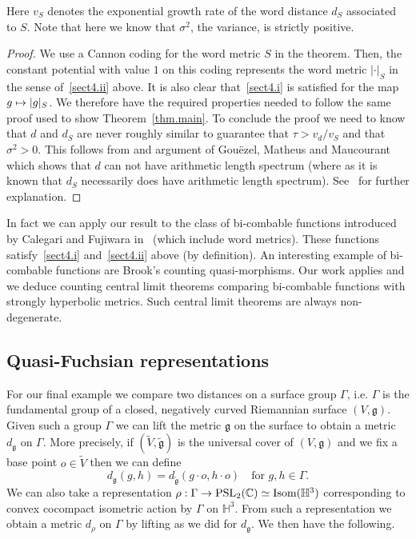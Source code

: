 \documentclass[10pt]{amsart}
\theoremstyle{definition}\newtheorem{defi}[theo]{Definition}\newtheorem{rema}[theo]{Remark}\newtheorem{exam}[theo]{Example}\newtheorem{exem}[theo]{Example}\newtheorem{nota}[theo]{Notation}
\newcommand{\G}{\Gamma}
\newcommand{\fkg}{\mathfrak{g}}
\newcommand{\C}{\mathbb{C}}
\renewcommand{\H}{\mathbb{H}}
\DeclareMathOperator{\PSL}{PSL}
\renewcommand*{\to}{\mathchoice{\longrightarrow}{\rightarrow}{\rightarrow}{\rightarrow}}
\let\oldmapsto\mapsto
\renewcommand*{\mapsto}{\mathchoice{\longmapsto}{\oldmapsto}{\oldmapsto}{\oldmapsto}}
\theoremstyle{plain}
\begin{document}
Here $v_S$ denotes the exponential growth rate of the word distance $d_S$ associated to $S$. Note that here we know that $\sigma^2$, the variance, is strictly positive.
\begin{proof}
We use a Cannon coding for the word metric $S$ in the theorem. Then, the constant potential with value $1$ on this coding represents the word metric $|\cdot|_S$ in the sense of~\eqref{sect4.ii} above. It is also clear that~\eqref{sect4.i} is satisfied for the map $g \mapsto |g|_S$. We therefore have the required properties needed to follow the same proof used to show Theorem~\ref{thm.main}. To conclude the proof we need to know that $d$ and $d_S$ are never roughly similar to guarantee that $\tau > v_d/v_S$ and that $\sigma^2 > 0$. This follows from and argument of Gou\"ezel, Matheus and Maucourant~\cite{GMM2018} which shows that $d$ can not have arithmetic length spectrum (where as it is known that $d_S$ necessarily does have arithmetic length spectrum). See~\cite[Proposition~1.13]{cantrell} for further explanation.
\end{proof}

In fact we can apply our result to the class of bi-combable functions introduced by Calegari and Fujiwara in~\cite{CalegariFujiwara2010} (which include word metrics). These functions satisfy~\eqref{sect4.i} and~\eqref{sect4.ii} above (by definition). An interesting example of bi-combable functions are Brook's counting quasi-morphisms. Our work applies and we deduce counting central limit theorems comparing bi-combable functions with strongly hyperbolic metrics. Such central limit theorems are always non-degenerate.



\subsection{Quasi-Fuchsian representations} For our final example we compare two distances on a surface group $\G$, i.e. $\G$ is the fundamental group of a closed, negatively curved Riemannian surface $(V,\fkg)$. Given such a group $\G$ we can lift the metric $\fkg$ on the surface to obtain a metric $d_\fkg$ on $\G$. More precisely, if $(\widetilde{V}, \widetilde{\fkg})$ is the universal cover of $(V,\fkg)$ and we fix a base point $o\in\widetilde{V}$ then we can define
\[
d_\fkg(g,h) = d_{\widetilde{\fkg}}(g \cdot o, h \cdot o) \quad \text{for }g,h \in \G.
\]
We can also take a representation $\rho : \G \to \PSL_2(\C) \simeq \text{Isom}(\H^3)$ corresponding to convex cocompact isometric action by $\G$ on $\H^3$. From such a representation we obtain a metric $d_{\rho}$ on $\G$ by lifting as we did for $d_\fkg$. We then have the following.
\end{document}
